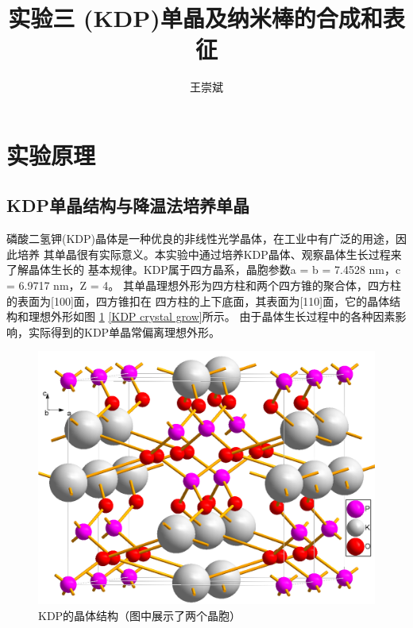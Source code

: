 \documentclass[a4paper,zihao=5,UTF8]{ctexart}
\title{\textbf{实验三 \ce{KH_2PO_4}(KDP)单晶及\ce{Au}纳米棒的合成和表征\cite{inorganic_chemistry_1}}}
\author{王崇斌\;1800011716}
\begin{document}
	\pagestyle{fancy}
	\pagestyle{fancy}
	\chead{}
	\rhead{\today}
	\maketitle
    \thispagestyle{fancy}
	\section{实验原理}
    \subsection{KDP单晶结构与降温法培养单晶}
    磷酸二氢钾(KDP)晶体是一种优良的非线性光学晶体，在工业中有广泛的用途，因此培养
    其单晶很有实际意义。本实验中通过培养KDP晶体、观察晶体生长过程来了解晶体生长的
    基本规律。KDP属于四方晶系，晶胞参数a = b = 7.4528 nm，c = 6.9717 nm，Z = 4。
    其单晶理想外形为四方柱和两个四方锥的聚合体，四方柱的表面为[100]面，四方锥扣在
    四方柱的上下底面，其表面为[110]面，它的晶体结构和理想外形如图
    \ref{KDP crystal structure} \ref{KDP crystal grow}所示。
    由于晶体生长过程中的各种因素影响，实际得到的KDP单晶常偏离理想外形。
    \begin{figure}[htbp]
        \centering 
        \includegraphics[scale=0.15]{TetragonalKH2PO4structure.png}
        \caption{KDP的晶体结构（图中展示了两个晶胞）}
        \label{KDP crystal structure}
    \end{figure}
\end{document}
